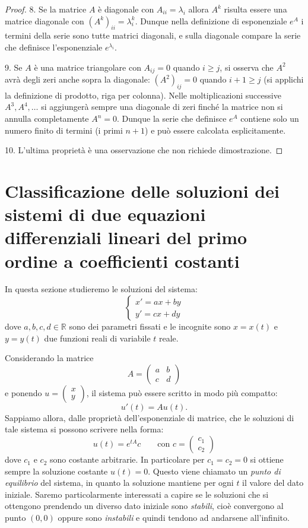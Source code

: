 \documentclass[italian,a4paper]{scrartcl}
\newcommand{\RR}{{\mathbb R}}
\begin{document}
\begin{theorem}
\begin{proof}
8. Se la matrice $A$ è diagonale con $A_{ii}=\lambda_i$ allora $A^k$
risulta essere una matrice diagonale con $(A^k)_{ii} =
\lambda_i^k$. Dunque nella definizione di esponenziale $e^A$ i termini
della serie sono tutte matrici diagonali, e sulla diagonale compare la
serie che definisce l'esponenziale $e^{\lambda_i}$.

9. Se $A$ è una matrice triangolare con $A_{ij}=0$ quando $i\ge j$, si
osserva che $A^2$ avrà degli zeri anche sopra la diagonale:
$(A^2)_{ij}=0$ quando $i+1\ge j$ (si applichi la definizione di
prodotto, riga per colonna). Nelle moltiplicazioni successive $A^3,
A^4,\dots$ si aggiungerà sempre una diagonale di zeri finché la matrice non
si annulla completamente $A^n=0$. Dunque la serie che definisce $e^A$
contiene solo un numero finito di termini (i primi $n+1$) e può essere
calcolata esplicitamente.

10. L'ultima proprietà è una osservazione che non richiede dimostrazione.
\end{proof}
\end{theorem}

\section{Classificazione delle soluzioni dei sistemi di due equazioni
  differenziali lineari del primo ordine a coefficienti costanti}

In questa sezione studieremo le soluzioni del sistema:
\[
\begin{cases}
 x' = a x + b y\\
 y' = c x + d y
\end{cases}
\] 
dove $a,b,c,d\in \RR$ sono dei parametri fissati e le incognite sono
$x=x(t)$ e $y=y(t)$ due funzioni reali di variabile $t$ reale.

Considerando la matrice
\[
A = \begin{pmatrix}
a & b \\
c & d
\end{pmatrix}
\]
e ponendo $u = \begin{pmatrix}x\\y\end{pmatrix}$, il sistema può essere scritto in modo più
compatto:
\[
 u'(t) = A u(t).
\]
Sappiamo allora, dalle proprietà dell'esponenziale di matrice, che le
soluzioni di tale sistema si possono scrivere nella forma:
\[
 u(t) = e^{tA}c \qquad \text{con } c=\begin{pmatrix}c_1\\c_2\end{pmatrix}
\]
dove $c_1$ e $c_2$ sono costante arbitrarie. In particolare per $c_1=c_2=0$ si
ottiene sempre la soluzione costante $u(t)=0$. Questo viene chiamato un \emph{punto
  di equilibrio} del sistema, in quanto la soluzione mantiene per ogni
$t$ il valore del dato iniziale. 
Saremo particolarmente interessati a
capire se le soluzioni che si ottengono prendendo un diverso dato iniziale
sono \emph{stabili},
cioè convergono al punto $(0,0)$ oppure sono \emph{instabili} e quindi
tendono ad andarsene all'infinito.
\end{document}
